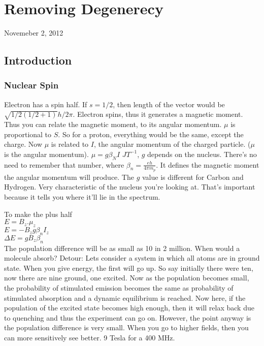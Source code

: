 \chapter{Removing Degenerecy}
\begin{flushright}
Novemeber 2, 2012
\end{flushright}
\section{Introduction}
	\subsection{Nuclear Spin}
		Electron has a spin half. If $s=1/2$, then length of the vector would be $\sqrt{1/2(1/2 + 1)}h/2\pi$. Electron spins, thus it generates a magnetic moment. Thus you can relate the magnetic moment, to its angular momentum. $\mu $ is proportional to $S$.
		So for a proton, everything would be the same, except the charge. Now $\mu$ is related to $I$, the angular momentum of the charged particle. ($\mu$ is the angular momentum). $\mu=g\beta_NI \,\, JT^{-1}$, $g$ depends on the nucleus. There's no need to remember that number, where $\beta_n=\frac{eh}{4\pi m_p}$. It defines the magnetic moment the angular momentum will produce. The $g$ value is different for Carbon and Hydrogen. Very characteristic of the nucleus you're looking at. That's important because it tells you where it'll lie in the spectrum.
		\par
		To make the plus half \\
		$E=B_z.\mu_z$ \\
		$E=-B_z g\beta_nI_z$ \\
		$\Delta E= gB_z\beta_n$ \\
		The population difference will be as small as 10 in 2 million. When would a molecule absorb? Detour: Lets consider a system in which all atoms are in ground state. When you give energy, the first will go up. So say initially there were ten, now there are nine ground, one excited. Now as the population becomes small, the probability of stimulated emission becomes the same as probability of stimulated absorption and a dynamic equilibrium is reached. Now here, if the population of the excited state becomes high enough, then it will relax back due to quenching and thus the experiment can go on. However, the point anyway is the population difference is very small. When you go to higher fields, then you can more sensitively see better. 9 Tesla for a 400 MHz. 

